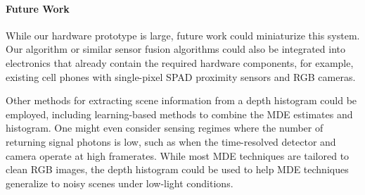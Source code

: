 


\paragraph{Future Work}
While our hardware prototype is large, future work could miniaturize this
system. Our algorithm or similar sensor fusion algorithms could
also be integrated into electronics that already contain the required hardware
components, for example, existing cell phones with single-pixel SPAD
proximity sensors and RGB cameras.

Other methods for extracting scene information from a depth histogram could be
employed, including learning-based methods to combine the MDE estimates and
histogram. One might even consider sensing regimes where the number of
returning signal photons is low, such as when the time-resolved detector and camera operate
at high framerates. While most MDE techniques are tailored to clean RGB images,  
the depth histogram could be used to help MDE
techniques generalize to noisy scenes under low-light conditions. 
 


